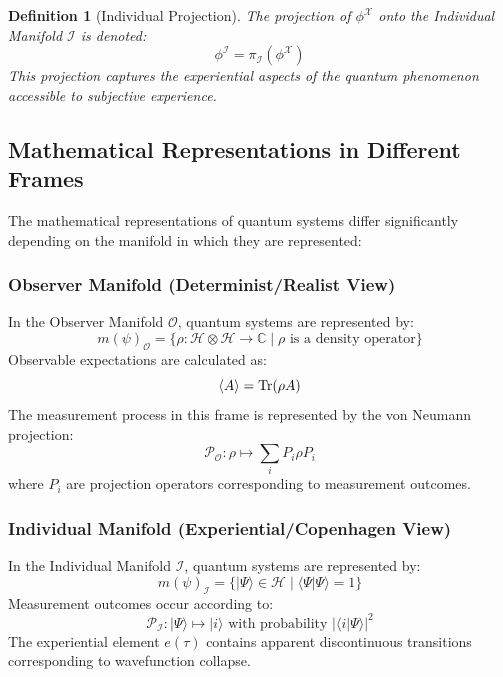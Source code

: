 \documentclass{article}
\newtheorem{definition}{Definition}
\begin{document}
\begin{definition}[Individual Projection]
The projection of $\phi^{\mathcal{X}}$ onto the Individual Manifold $\mathcal{I}$ is denoted:
\begin{equation}
\phi^{\mathcal{I}} = \pi_{\mathcal{I}}(\phi^{\mathcal{X}})
\end{equation}
This projection captures the experiential aspects of the quantum phenomenon accessible to subjective experience.
\end{definition}

\subsection{Mathematical Representations in Different Frames}

The mathematical representations of quantum systems differ significantly depending on the manifold in which they are represented:

\subsubsection{Observer Manifold (Determinist/Realist View)}

In the Observer Manifold $\mathcal{O}$, quantum systems are represented by:
\begin{equation}
m(\psi)_{\mathcal{O}} = \{\rho: \mathcal{H} \otimes \mathcal{H} \rightarrow \mathbb{C} \mid \rho \text{ is a density operator}\}
\end{equation}
Observable expectations are calculated as:
\begin{equation}
\langle A \rangle = \Tr(\rho A)
\end{equation}
The measurement process in this frame is represented by the von Neumann projection:
\begin{equation}
\mathcal{P}_{\mathcal{O}}: \rho \mapsto \sum_i P_i \rho P_i
\end{equation}
where $P_i$ are projection operators corresponding to measurement outcomes.

\subsubsection{Individual Manifold (Experiential/Copenhagen View)}

In the Individual Manifold $\mathcal{I}$, quantum systems are represented by:
\begin{equation}
m(\psi)_{\mathcal{I}} = \{|\Psi\rangle \in \mathcal{H} \mid \langle\Psi|\Psi\rangle = 1\}
\end{equation}
Measurement outcomes occur according to:
\begin{equation}
\mathcal{P}_{\mathcal{I}}: |\Psi\rangle \mapsto |i\rangle \text{ with probability } |\langle i|\Psi\rangle|^2
\end{equation}
The experiential element $e(\tau)$ contains apparent discontinuous transitions corresponding to wavefunction collapse.
\end{document}
